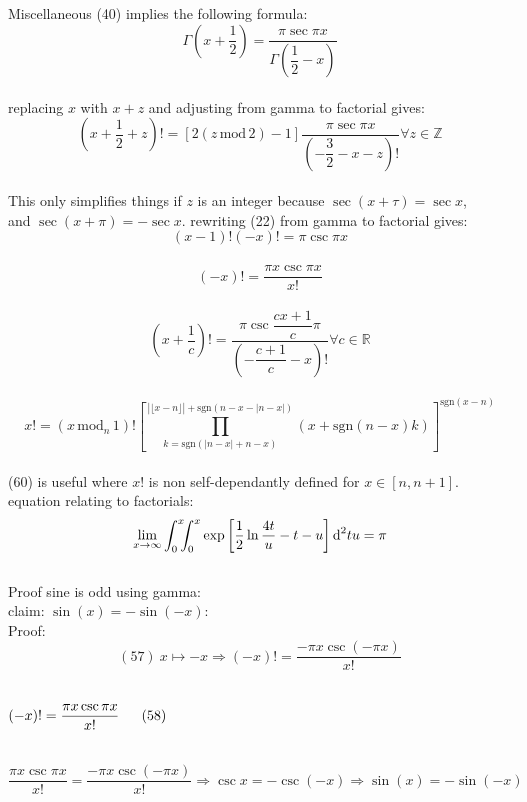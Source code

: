 \documentclass[12pt]{article}
\begin{document}
\pagebreak\begin{section}{Miscellaneous}
	(40) implies the following formula:
	\begin{equation}
		\Gamma\left(x+\dfrac12\right)=\dfrac{\pi\sec\pi x}{\Gamma\left(\dfrac12-x\right)}
	\end{equation}\\
	replacing $x$ with $x+z$ and adjusting from gamma to factorial gives:\\
	\begin{equation}
		\left(x+\frac12+z\right)!=\left[2\left(z\,\text{mod}\,2\right)-1\right]\dfrac{\pi\sec\pi x}{\left(-\dfrac32-x-z\right)!}\forall z\in\mathbb Z
	\end{equation}\\
	This only simplifies things if $z$ is an integer because $\sec(x+\tau)=\sec x$,\\
	and $\sec(x+\pi)=-\sec x$. rewriting (22) from gamma to factorial gives:
	\begin{equation}
		(x-1)!(-x)!=\pi\csc\pi x
	\end{equation}\\
	\begin{equation}
		(-x)!=\dfrac{\pi x\csc\pi x}{x!}
	\end{equation}\\
	\begin{equation}
		\left(x+\dfrac1c\right)!=\dfrac{\pi\csc\dfrac{cx+1}c\pi}{\left(-\dfrac{c+1}c-x\right)!}\forall c\in\mathbb R
	\end{equation}\\
	\begin{equation}
		x!=(x\,\text{mod}_n\,1)!\left[\prod_{k=\text{sgn}(|n-x|+n-x)}^{|\lfloor x-n\rfloor|+\text{sgn}(n-x-|n-x|)}\left(x+\text{sgn}(n-x)k\right)\right]^{\text{sgn}(x-n)}
	\end{equation}\\
	(60) is useful where $x!$ is non self-dependantly defined for $x\in[n,n+1]$.\\
	equation relating to factorials:
	\begin{equation}
		\lim_{x\to\infty}\int_0^x\hspace{-0.5em}\int_0^x\exp\left[\dfrac12\ln\dfrac{4t}u-t-u\right]\text d^2tu=\pi
	\end{equation}
	\pagebreak\\
	Proof sine is odd using gamma:\\
	claim: $\sin(x)=-\sin(-x)$:\\
	Proof:\\
	\begin{equation}
		(57)~x\mapsto-x\Longrightarrow(-x)!=\dfrac{-\pi x\csc(-\pi x)}{x!}
	\end{equation}\\
	\centerline{$(-x)!=\dfrac{\pi x\csc\pi x}{x!}\hspace{1.6em}(58)$}\\
	\begin{equation}
		\dfrac{\pi x\csc\pi x}{x!}=\dfrac{-\pi x\csc(-\pi x)}{x!}\Longrightarrow\csc x=-\csc(-x)\Longrightarrow\sin(x)=-\sin(-x)
	\end{equation}\\
	\blacksquare\\


\end{section}
\end{document}
